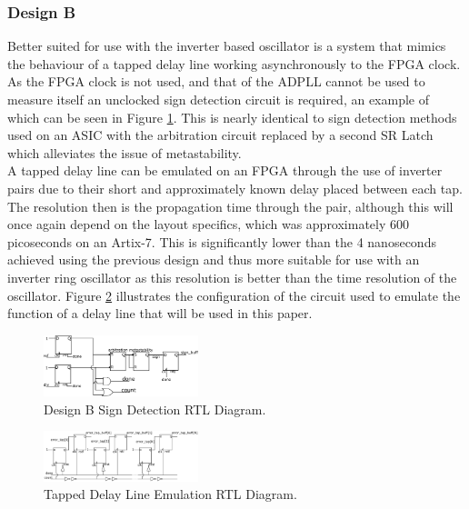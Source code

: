 \documentclass[conference]{IEEEtran}
\begin{document}
\subsubsection*{Design B}
Better suited for use with the inverter based oscillator is a system that mimics the behaviour of a tapped delay line working asynchronously to the FPGA clock. As the FPGA clock is not used, and that of the ADPLL cannot be used to measure itself an unclocked sign detection circuit is required, an example of which can be seen in Figure \ref{fig:segn_pdetdl}. This is nearly identical to sign detection methods used on an ASIC with the arbitration circuit replaced by a second SR Latch which alleviates the issue of metastability.\\
A tapped delay line can be emulated on an FPGA through the use of inverter pairs due to their short and approximately known delay placed between each tap.
The resolution then is the propagation time through the pair, although this will once again depend on the layout specifics, which was approximately 600 picoseconds on an Artix-7. This is significantly lower than the 4 nanoseconds achieved using the previous design and thus more suitable for use with an inverter ring oscillator as this resolution is better than the time resolution of the oscillator. Figure \ref{fig:num_pdetdl} illustrates the configuration of the circuit used to emulate the function of a delay line that will be used in this paper.
\begin{figure}[h]
    \centering
    \includegraphics[width=0.4\textwidth]{../new_pdet1}
    \caption{Design B Sign Detection RTL Diagram.}
    \label{fig:segn_pdetdl}
\end{figure}
\begin{figure}[h]
    \centering
    \includegraphics[width=0.4\textwidth]{../new_pdet2}
    \caption{Tapped Delay Line Emulation RTL Diagram.}
    \label{fig:num_pdetdl}
\end{figure}
\end{document}
